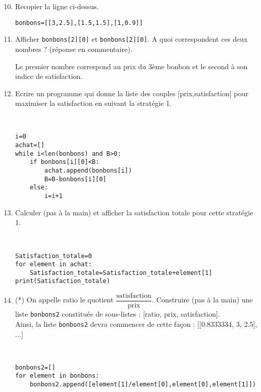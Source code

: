 \begin{enumerate}
\setcounter{enumi}{9}
\item Recopier la ligne ci-dessus.
\begin{solution}
\verb?bonbons=[[3,2.5],[1.5,1.5],[1,0.9]]?
\end{solution}
\item Afficher \verb?bonbons[2][0]? et \verb?bonbons[2][0]?. A quoi correspondent ces deux nombres ? (réponse en commentaire).
\begin{solution}
Le premier nombre correspond au prix du 3ème bonbon et le second à son indice de satisfaction.
\end{solution}
\item Ecrire un programme qui donne la liste des couples [prix,satisfaction] pour maximiser la satisfaction en suivant la stratégie 1.
\begin{solution}~ \\\vspace{-0.7cm}
\begin{verbatim}
i=0
achat=[]
while i<len(bonbons) and B>0:
    if bonbons[i][0]<B:
        achat.append(bonbons[i])
        B=B-bonbons[i][0]
    else:
        i=i+1
\end{verbatim}
\end{solution}
\item Calculer (pas à la main) et afficher la satisfaction totale pour cette stratégie 1.
\begin{solution}~ \\\vspace{-0.7cm}
\begin{verbatim}
Satisfaction_totale=0
for element in achat:
    Satisfaction_totale=Satisfaction_totale+element[1]
print(Satisfaction_totale)
\end{verbatim}
\end{solution}
\item (*) On appelle ratio le quotient $\dfrac{\text{satisfaction}}{\text{prix}}$.
Construire (pas à la main) une liste \verb?bonbons2? constituée de sous-listes : [ratio, prix, satisfaction].\\
Ainsi, la liste \verb?bonbons2? devra commencer de cette façon : [[0.8333334, 3, 2.5], ...]
\begin{solution}~ \\\vspace{-0.7cm}
\begin{verbatim}
bonbons2=[]
for element in bonbons:
    bonbons2.append([element[1]/element[0],element[0],element[1]])

\end{verbatim}
\end{solution}
\end{enumerate}
